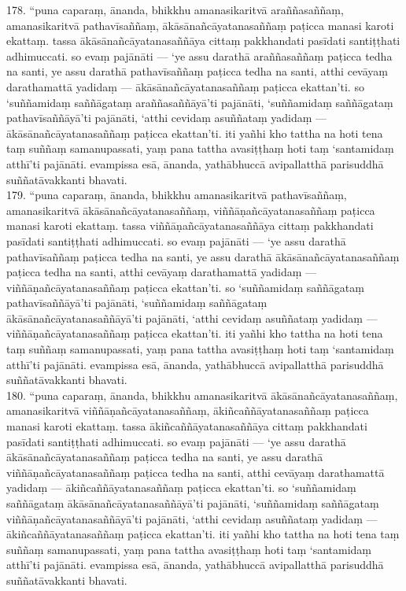 \documentclass[11pt]{article}
\begin{document}
178. “puna caparaṃ, ānanda, bhikkhu amanasikaritvā araññasaññaṃ, amanasikaritvā pathavīsaññaṃ, ākāsānañcāyatanasaññaṃ paṭicca manasi karoti ekattaṃ. tassa ākāsānañcāyatanasaññāya cittaṃ pakkhandati pasīdati santiṭṭhati adhimuccati. so evaṃ pajānāti — ‘ye assu darathā araññasaññaṃ paṭicca tedha na santi, ye assu darathā pathavīsaññaṃ paṭicca tedha na santi, atthi cevāyaṃ darathamattā yadidaṃ — ākāsānañcāyatanasaññaṃ paṭicca ekattan’ti. so ‘suññamidaṃ saññāgataṃ araññasaññāyā’ti pajānāti, ‘suññamidaṃ saññāgataṃ pathavīsaññāyā’ti pajānāti, ‘atthi cevidaṃ asuññataṃ yadidaṃ — ākāsānañcāyatanasaññaṃ paṭicca ekattan’ti. iti yañhi kho tattha na hoti tena taṃ suññaṃ samanupassati, yaṃ pana tattha avasiṭṭhaṃ hoti taṃ ‘santamidaṃ atthī’ti pajānāti. evampissa esā, ānanda, yathābhuccā avipallatthā parisuddhā suññatāvakkanti bhavati.\\

179. “puna caparaṃ, ānanda, bhikkhu amanasikaritvā pathavīsaññaṃ, amanasikaritvā ākāsānañcāyatanasaññaṃ, viññāṇañcāyatanasaññaṃ paṭicca manasi karoti ekattaṃ. tassa viññāṇañcāyatanasaññāya cittaṃ pakkhandati pasīdati santiṭṭhati adhimuccati. so evaṃ pajānāti — ‘ye assu darathā pathavīsaññaṃ paṭicca tedha na santi, ye assu darathā ākāsānañcāyatanasaññaṃ paṭicca tedha na santi, atthi cevāyaṃ darathamattā yadidaṃ — viññāṇañcāyatanasaññaṃ paṭicca ekattan’ti. so ‘suññamidaṃ saññāgataṃ pathavīsaññāyā’ti pajānāti, ‘suññamidaṃ saññāgataṃ ākāsānañcāyatanasaññāyā’ti pajānāti, ‘atthi cevidaṃ asuññataṃ yadidaṃ — viññāṇañcāyatanasaññaṃ paṭicca ekattan’ti. iti yañhi kho tattha na hoti tena taṃ suññaṃ samanupassati, yaṃ pana tattha avasiṭṭhaṃ hoti taṃ ‘santamidaṃ atthī’ti pajānāti. evampissa esā, ānanda, yathābhuccā avipallatthā parisuddhā suññatāvakkanti bhavati.\\

180. “puna caparaṃ, ānanda, bhikkhu amanasikaritvā ākāsānañcāyatanasaññaṃ, amanasikaritvā viññāṇañcāyatanasaññaṃ, ākiñcaññāyatanasaññaṃ paṭicca manasi karoti ekattaṃ. tassa ākiñcaññāyatanasaññāya cittaṃ pakkhandati pasīdati santiṭṭhati adhimuccati. so evaṃ pajānāti — ‘ye assu darathā ākāsānañcāyatanasaññaṃ paṭicca tedha na santi, ye assu darathā viññāṇañcāyatanasaññaṃ paṭicca tedha na santi, atthi cevāyaṃ darathamattā yadidaṃ — ākiñcaññāyatanasaññaṃ paṭicca ekattan’ti. so ‘suññamidaṃ saññāgataṃ ākāsānañcāyatanasaññāyā’ti pajānāti, ‘suññamidaṃ saññāgataṃ viññāṇañcāyatanasaññāyā’ti pajānāti, ‘atthi cevidaṃ asuññataṃ yadidaṃ — ākiñcaññāyatanasaññaṃ paṭicca ekattan’ti. iti yañhi kho tattha na hoti tena taṃ suññaṃ samanupassati, yaṃ pana tattha avasiṭṭhaṃ hoti taṃ ‘santamidaṃ atthī’ti pajānāti. evampissa esā, ānanda, yathābhuccā avipallatthā parisuddhā suññatāvakkanti bhavati.\\
\end{document}
